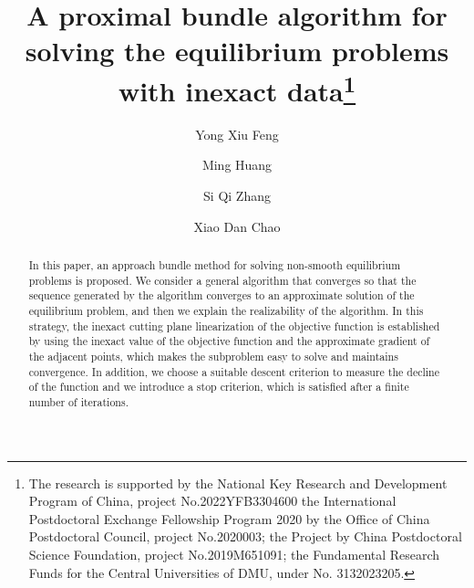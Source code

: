 \documentclass[12pt]{llncs}
\begin{document}
\fi
%
\title{A proximal bundle algorithm for solving the equilibrium problems with inexact
data\thanks{The research is supported by the National Key Research and Development Program of China, project No.2022YFB3304600 the International Postdoctoral Exchange Fellowship Program 2020 by the Office of China Postdoctoral Council, project No.2020003; the Project by China Postdoctoral Science Foundation, project No.2019M651091; the Fundamental Research Funds for the Central Universities of DMU, under No. 3132023205.}}
\author{Yong Xiu Feng \and Ming Huang \and Si Qi Zhang \and Xiao Dan Chao
  }

\maketitle

\begin{abstract}
 In this paper, an approach bundle method for solving non-smooth equilibrium problems is proposed. We consider a general algorithm that converges so that the sequence generated by the algorithm converges to an approximate solution of the equilibrium problem, and then we explain the realizability of the algorithm. In this strategy, the inexact cutting plane linearization of the objective function is established by using the inexact value of the objective function and the approximate gradient of the adjacent points, which makes the subproblem easy to solve and maintains convergence. In addition, we choose a suitable descent criterion to measure the decline of the function and we introduce a stop criterion, which is satisfied after a finite number of iterations.

\end{abstract}
\end{document}
